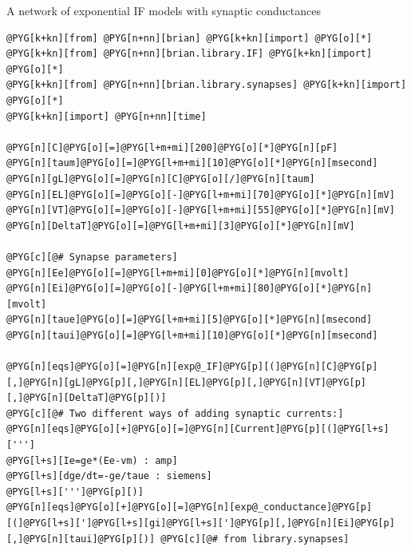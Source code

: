 \documentclass[letterpaper,10pt,english]{manual}
\begin{document}
A network of exponential IF models with synaptic conductances

\begin{Verbatim}[commandchars=@\[\]]
@PYG[k+kn][from] @PYG[n+nn][brian] @PYG[k+kn][import] @PYG[o][*]
@PYG[k+kn][from] @PYG[n+nn][brian.library.IF] @PYG[k+kn][import] @PYG[o][*]
@PYG[k+kn][from] @PYG[n+nn][brian.library.synapses] @PYG[k+kn][import] @PYG[o][*]
@PYG[k+kn][import] @PYG[n+nn][time]

@PYG[n][C]@PYG[o][=]@PYG[l+m+mi][200]@PYG[o][*]@PYG[n][pF]
@PYG[n][taum]@PYG[o][=]@PYG[l+m+mi][10]@PYG[o][*]@PYG[n][msecond]
@PYG[n][gL]@PYG[o][=]@PYG[n][C]@PYG[o][/]@PYG[n][taum]
@PYG[n][EL]@PYG[o][=]@PYG[o][-]@PYG[l+m+mi][70]@PYG[o][*]@PYG[n][mV]
@PYG[n][VT]@PYG[o][=]@PYG[o][-]@PYG[l+m+mi][55]@PYG[o][*]@PYG[n][mV]
@PYG[n][DeltaT]@PYG[o][=]@PYG[l+m+mi][3]@PYG[o][*]@PYG[n][mV]

@PYG[c][@# Synapse parameters]
@PYG[n][Ee]@PYG[o][=]@PYG[l+m+mi][0]@PYG[o][*]@PYG[n][mvolt]
@PYG[n][Ei]@PYG[o][=]@PYG[o][-]@PYG[l+m+mi][80]@PYG[o][*]@PYG[n][mvolt]
@PYG[n][taue]@PYG[o][=]@PYG[l+m+mi][5]@PYG[o][*]@PYG[n][msecond]
@PYG[n][taui]@PYG[o][=]@PYG[l+m+mi][10]@PYG[o][*]@PYG[n][msecond]

@PYG[n][eqs]@PYG[o][=]@PYG[n][exp@_IF]@PYG[p][(]@PYG[n][C]@PYG[p][,]@PYG[n][gL]@PYG[p][,]@PYG[n][EL]@PYG[p][,]@PYG[n][VT]@PYG[p][,]@PYG[n][DeltaT]@PYG[p][)]
@PYG[c][@# Two different ways of adding synaptic currents:]
@PYG[n][eqs]@PYG[o][+]@PYG[o][=]@PYG[n][Current]@PYG[p][(]@PYG[l+s][''']
@PYG[l+s][Ie=ge*(Ee-vm) : amp]
@PYG[l+s][dge/dt=-ge/taue : siemens]
@PYG[l+s][''']@PYG[p][)]
@PYG[n][eqs]@PYG[o][+]@PYG[o][=]@PYG[n][exp@_conductance]@PYG[p][(]@PYG[l+s][']@PYG[l+s][gi]@PYG[l+s][']@PYG[p][,]@PYG[n][Ei]@PYG[p][,]@PYG[n][taui]@PYG[p][)] @PYG[c][@# from library.synapses]


\end{Verbatim}
\end{document}
